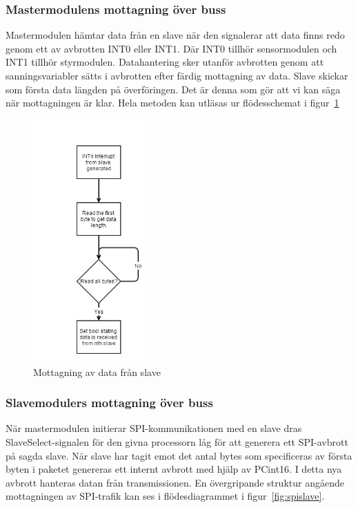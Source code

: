 \documentclass[a4paper,12pt,fleqn]{article}
\begin{document}
\subsubsection{Mastermodulens mottagning över buss}

Mastermodulen hämtar data från en slave när den signalerar att data finns redo genom ett av avbrotten INT0 eller INT1. Där INT0 tillhör sensormodulen och INT1 tillhör styrmodulen. Datahantering sker utanför avbrotten genom att sanningsvariabler sätts i avbrotten efter färdig mottagning av data.
Slave skickar som första data längden på överföringen. Det är denna som gör att vi kan säga när mottagningen är klar. Hela metoden kan utläsas ur flödesschemat i figur~\ref{fig:spimaster}

\begin{figure}[htp] %
  \begin{center}
  \includegraphics[keepaspectratio=true,width=0.4\textwidth]{bilder/masterinterrupt.jpg}  %
  \end{center}
  \caption{Mottagning av data från slave} %
  \label{fig:spimaster}
\end{figure}


\subsubsection{Slavemodulers mottagning över buss}
När mastermodulen initierar SPI-kommunikationen med en slave dras SlaveSelect-signalen för den givna processorn låg för att generera ett SPI-avbrott på sagda slave. När slave har tagit emot det antal bytes som specificeras av första byten i paketet genereras ett internt avbrott med hjälp av PCint16. I detta nya avbrott hanteras datan från transmissionen. En övergripande struktur angående mottagningen av SPI-trafik kan ses i flödesdiagrammet i figur~\ref{fig:spislave}.
\end{document}
